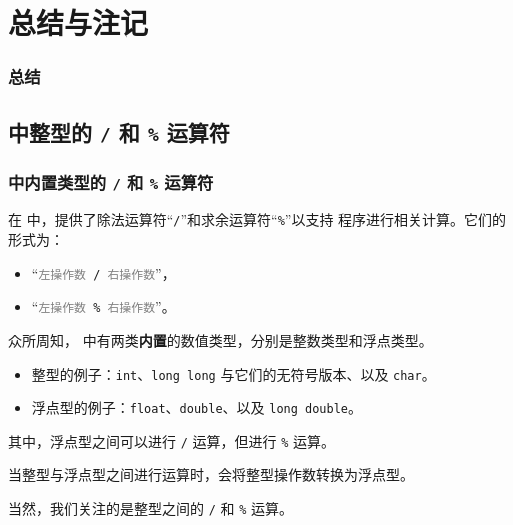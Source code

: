 
\section{总结与注记}
\begin{frame}
  \frametitle{总结}
\end{frame}
\begin{frame}[c]
  \thankspage
\end{frame}
\subsection{\Cpp{} 中整型的 \texttt{/} 和 \texttt{\%} 运算符}\label{appcppdivmod}
\begin{frame}[c]
  \progressnow*
\end{frame}
\begin{frame}
  \frametitle{\Cpp{} 中\textbf{内置类型}的 \texttt{/} 和 \texttt{\%} 运算符}
  在 \Cpp{} 中，提供了\alert{除法运算符}“\texttt{/}”和\alert{求余运算符}“\texttt{\%}”以支持 \Cpp{} 程序进行相关计算。它们的形式为：
  \begin{itemize}
    \item “\texttt{\textcolor{gray}{左操作数} / \textcolor{gray}{右操作数}}”，
    \item “\texttt{\textcolor{gray}{左操作数} \% \textcolor{gray}{右操作数}}”。
  \end{itemize}
  \pause
  
  \emptyline
  众所周知，\Cpp{} 中有两类\textbf{内置}的数值类型，分别是\alert{整数类型}和\alert{浮点类型}。
  \begin{itemize}
    \item 整型的例子：\texttt{int}、\texttt{long long} 与它们的无符号版本、以及 \texttt{char}。
    \item 浮点型的例子：\texttt{float}、\texttt{double}、以及 \texttt{long double}。
  \end{itemize}
  \pause
  其中，浮点型之间可以进行 \texttt{/} 运算，但进行 \texttt{\%} 运算。
  
  当整型与浮点型之间进行运算时，会将整型操作数转换为浮点型。
  \pause
  
  \emptyline
  当然，我们关注的是整型之间的 \texttt{/} 和 \texttt{\%} 运算。
\end{frame}
